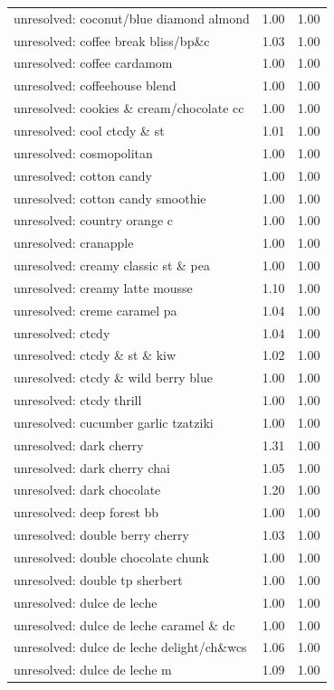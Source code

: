\begin{table}
\begin{tabular}{lrr}
unresolved: coconut/blue diamond almond & 1.00 & 1.00 \\
unresolved: coffee break bliss/bp\&c & 1.03 & 1.00 \\
unresolved: coffee cardamom & 1.00 & 1.00 \\
unresolved: coffeehouse blend & 1.00 & 1.00 \\
unresolved: cookies \& cream/chocolate cc & 1.00 & 1.00 \\
unresolved: cool ctcdy \& st & 1.01 & 1.00 \\
unresolved: cosmopolitan & 1.00 & 1.00 \\
unresolved: cotton candy & 1.00 & 1.00 \\
unresolved: cotton candy smoothie & 1.00 & 1.00 \\
unresolved: country orange c & 1.00 & 1.00 \\
unresolved: cranapple & 1.00 & 1.00 \\
unresolved: creamy classic st \& pea & 1.00 & 1.00 \\
unresolved: creamy latte mousse & 1.10 & 1.00 \\
unresolved: creme caramel pa & 1.04 & 1.00 \\
unresolved: ctcdy & 1.04 & 1.00 \\
unresolved: ctcdy \& st \& kiw & 1.02 & 1.00 \\
unresolved: ctcdy \& wild berry blue & 1.00 & 1.00 \\
unresolved: ctcdy thrill & 1.00 & 1.00 \\
unresolved: cucumber garlic tzatziki & 1.00 & 1.00 \\
unresolved: dark cherry & 1.31 & 1.00 \\
unresolved: dark cherry chai & 1.05 & 1.00 \\
unresolved: dark chocolate & 1.20 & 1.00 \\
unresolved: deep forest bb & 1.00 & 1.00 \\
unresolved: double berry cherry & 1.03 & 1.00 \\
unresolved: double chocolate chunk & 1.00 & 1.00 \\
unresolved: double tp sherbert & 1.00 & 1.00 \\
unresolved: dulce de leche & 1.00 & 1.00 \\
unresolved: dulce de leche caramel \& dc & 1.00 & 1.00 \\
unresolved: dulce de leche delight/ch\&wcs & 1.06 & 1.00 \\
unresolved: dulce de leche m & 1.09 & 1.00 \\

\end{tabular}
\end{table}
